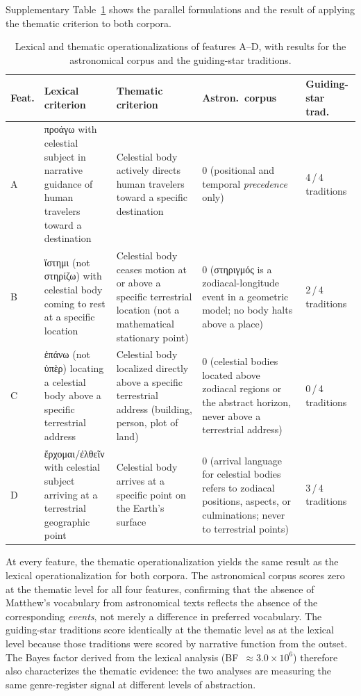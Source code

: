 \documentclass[11pt,a4paper]{article}
\newcommand{\grk}[1]{{\fontencoding{LGR}\selectfont #1}}
\newcommand{\grk}[1]{{\greekfont #1}}
\begin{document}
Supplementary Table~\ref{tab:thematic} shows the parallel formulations and the result of
applying the thematic criterion to both corpora.

\begin{table}[h]
  \caption{Lexical and thematic operationalizations of features A--D, with
    results for the astronomical corpus and the guiding-star traditions.}
  \label{tab:thematic}
  \centering
  \small
  \begin{tabular}{@{}p{0.5cm}p{3.8cm}p{3.8cm}p{2.2cm}p{2.2cm}@{}}
    \toprule
    Feat. & Lexical criterion & Thematic criterion &
      Astron.\ corpus & Guiding-star trad. \\
    \midrule
    A & \grk{προάγω} with celestial subject in narrative guidance of
        human travelers toward a destination &
      Celestial body actively directs human travelers toward a specific
        destination &
      0 (positional and temporal \emph{precedence} only) &
      4\,/\,4 traditions \\[4pt]
    B & \grk{ἵστημι} (not \grk{στηρίζω}) with celestial body coming to
        rest at a specific location &
      Celestial body ceases motion at or above a specific terrestrial
        location (not a mathematical stationary point) &
      0 (\grk{στηριγμός} is a zodiacal-longitude event in a geometric
        model; no body halts above a place) &
      2\,/\,4 traditions \\[4pt]
    C & \grk{ἐπάνω} (not \grk{ὑπὲρ}) locating a celestial body above
        a specific terrestrial address &
      Celestial body localized directly above a specific terrestrial
        address (building, person, plot of land) &
      0 (celestial bodies located above zodiacal regions or the abstract
        horizon, never above a terrestrial address) &
      0\,/\,4 traditions \\[4pt]
    D & \grk{ἔρχομαι}/\grk{ἐλθεῖν} with celestial subject arriving at
        a terrestrial geographic point &
      Celestial body arrives at a specific point on the Earth's surface &
      0 (arrival language for celestial bodies refers to zodiacal
        positions, aspects, or culminations; never to terrestrial points) &
      3\,/\,4 traditions \\
    \bottomrule
  \end{tabular}
  \smallskip\par
  {\small At every feature, the thematic operationalization yields the same
  result as the lexical operationalization for both corpora. The astronomical
  corpus scores zero at the thematic level for all four features, confirming
  that the absence of Matthew's vocabulary from astronomical texts reflects the
  absence of the corresponding \emph{events}, not merely a difference in
  preferred vocabulary. The guiding-star traditions score identically at the
  thematic level as at the lexical level because those traditions were scored
  by narrative function from the outset. The Bayes factor derived from the
  lexical analysis (BF~$\approx 3.0\times10^{6}$) therefore also characterizes the
  thematic evidence: the two analyses are measuring the same genre-register
  signal at different levels of abstraction.}
\end{table}
\end{document}
